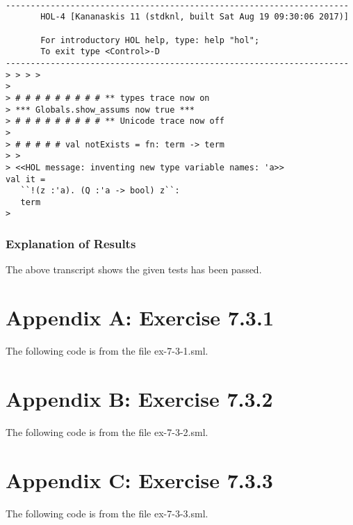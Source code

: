 \documentclass{report}
\begin{document}
\setcounter{sessioncount}{0}
\begin{session}
  \begin{scriptsize}
\begin{verbatim}

---------------------------------------------------------------------
       HOL-4 [Kananaskis 11 (stdknl, built Sat Aug 19 09:30:06 2017)]

       For introductory HOL help, type: help "hol";
       To exit type <Control>-D
---------------------------------------------------------------------
> > > > 
> 
> # # # # # # # # # ** types trace now on
> *** Globals.show_assums now true ***
> # # # # # # # # # ** Unicode trace now off
> 
> # # # # # val notExists = fn: term -> term
> > 
> <<HOL message: inventing new type variable names: 'a>>
val it =
   ``!(z :'a). (Q :'a -> bool) z``:
   term
> 

\end{verbatim}
  \end{scriptsize}
\end{session}

\subsection{Explanation of Results}
\label{sec:explanation-results-3}

The above transcript shows the given tests has been passed.


\chapter{Appendix A: Exercise 7.3.1}
\label{cha:appendix-a:-exercise731}

The following code is from the file ex-7-3-1.sml.


\chapter{Appendix B: Exercise 7.3.2}
\label{cha:appendix-a:-exercise732}

The following code is from the file  ex-7-3-2.sml.


\chapter{Appendix C: Exercise 7.3.3}
\label{cha:appendix-a:-exercise733}

The following code is from the file  ex-7-3-3.sml.

\end{document}
